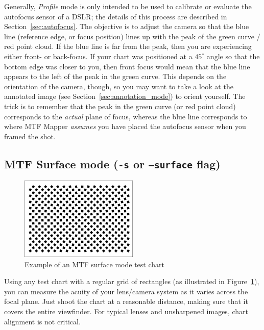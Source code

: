 \documentclass[a4paper]{article}
\begin{document}
Generally, \emph{Profile} mode is only intended to be used to calibrate or
evaluate the autofocus sensor of a DSLR; the details of this process are
described in Section~\ref{sec:autofocus}. The objective is to adjust the
camera so that the blue line (reference edge, or focus position) lines up
with the peak of the green curve / red point cloud. If the blue line is far
from the peak, then you are experiencing either front- or back-focus. If
your chart was positioned at a $45^\circ$ angle so that the bottom edge 
was closer to you, then front focus would mean that the blue line appears to
the left of the peak in the green curve. This depends on the orientation of
the camera, though, so you may want to take a look at the annotated image
(see Section~\ref{sec:annotation_mode}) to orient yourself. The trick is to
remember that the peak in the green curve (or red point cloud) corresponds
to the \emph{actual} plane of focus, whereas the blue line corresponds to
where MTF Mapper \emph{assumes} you have placed the autofocus sensor when you
framed the shot.

\subsection{MTF Surface mode (\texttt{-s} or \texttt{--surface} flag)}
\label{sec:surface_mode}
%
\begin{figure}
\centering
\includegraphics[width=0.5\textwidth]{figures/mtf_surface_test_chart}
\caption{Example of an MTF surface mode test chart}
\label{fig:surface_test_chart}
\end{figure}
%
Using any test chart with a regular grid of rectangles (as illustrated in
Figure~\ref{fig:surface_test_chart}), you can measure the acuity of your
lens/camera system as it varies across the focal plane. Just shoot the chart
at a reasonable distance, making sure that it covers the entire viewfinder.
For typical lenses and unsharpened images, chart alignment is not critical.
\end{document}
